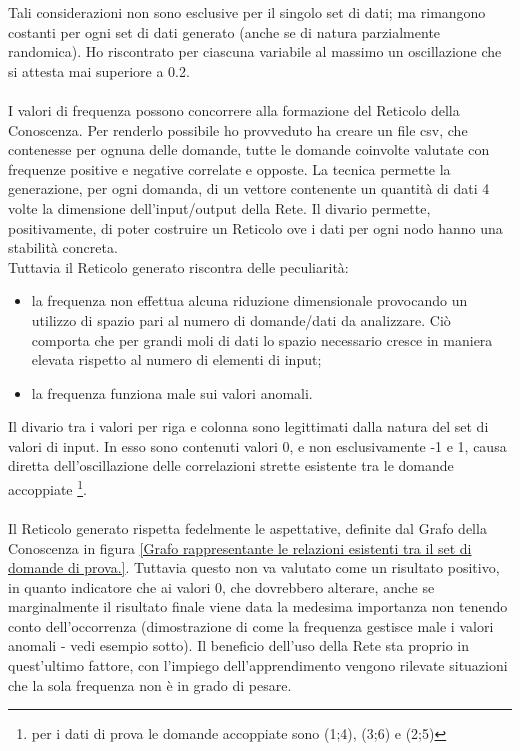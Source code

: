 \noindent
Tali considerazioni non sono esclusive per il singolo set di dati; ma rimangono costanti per ogni set di dati generato (anche se di natura parzialmente randomica). Ho riscontrato per ciascuna variabile al massimo un oscillazione che si attesta mai superiore a 0.2.
\\\\
I valori di frequenza possono concorrere alla formazione del Reticolo della Conoscenza. Per renderlo possibile ho provveduto ha creare un file csv, che contenesse per ognuna delle domande, tutte le domande coinvolte valutate con frequenze positive e negative correlate e opposte. La tecnica permette la generazione, per ogni domanda, di un vettore contenente un quantit\`a di dati 4 volte la dimensione dell'input/output della Rete.
Il divario permette, positivamente, di poter costruire un Reticolo ove i dati per ogni nodo hanno una stabilit\`a concreta.\\
Tuttavia il Reticolo generato riscontra delle peculiarit\`a:
\begin{itemize}
\item la frequenza non effettua alcuna riduzione dimensionale provocando un utilizzo di spazio pari al numero di domande/dati da analizzare. Ci\`o comporta che per grandi moli di dati lo spazio necessario cresce in maniera elevata rispetto al numero di elementi di input;
\item la frequenza funziona male sui valori anomali.
\end{itemize}
\noindent
Il divario tra i valori per riga e colonna sono legittimati dalla natura del set di valori di input. In esso sono contenuti valori 0, e non esclusivamente -1 e 1, causa diretta dell'oscillazione delle correlazioni strette esistente tra le domande accoppiate \footnote{per i dati di prova le domande accoppiate sono (1;4), (3;6) e (2;5)}.\\\\
\noindent
Il Reticolo generato rispetta fedelmente le aspettative, definite dal Grafo della Conoscenza in figura \ref{Grafo rappresentante le relazioni esistenti tra il set di domande di prova.}. Tuttavia questo non va valutato come un risultato positivo, in quanto indicatore che ai valori 0, che dovrebbero alterare, anche se marginalmente il risultato finale viene data la medesima importanza non tenendo conto dell'occorrenza (dimostrazione di come la frequenza gestisce male i valori anomali - vedi esempio sotto). Il beneficio dell'uso della Rete sta proprio in quest'ultimo fattore, con l'impiego dell'apprendimento vengono rilevate situazioni che la sola frequenza non \`e in grado di pesare.


